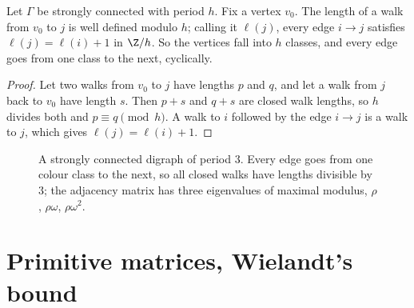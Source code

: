 \begin{proposition}\label{prop:levels}
Let $\Gamma$ be strongly connected with period $h$. Fix a vertex $v_0$. The length of a walk from $v_0$ to $j$ is
well defined modulo $h$; calling it $\ell(j)$, every edge $i\to j$ satisfies $\ell(j)=\ell(i)+1$ in $\Z/h$. So the vertices
fall into $h$ classes, and every edge goes from one class to the next, cyclically.
\end{proposition}
\begin{proof}
Let two walks from $v_0$ to $j$ have lengths $p$ and $q$, and let a walk from $j$ back to $v_0$ have length $s$. Then $p+s$ and
$q+s$ are closed walk lengths, so $h$ divides both and $p\equiv q\pmod h$. A walk to $i$ followed by the edge $i\to j$ is a walk
to $j$, which gives $\ell(j)=\ell(i)+1$.
\end{proof}

\begin{figure}[ht]
\centering
{}
\caption{A strongly connected digraph of period $3$. Every edge goes from one colour class to the next, so all closed walks
have lengths divisible by $3$; the adjacency matrix has three eigenvalues of maximal modulus, $\rho$, $\rho\omega$, $\rho\omega^2$.}
\label{fig:period}
\end{figure}

\section{Primitive matrices, Wielandt's bound}

